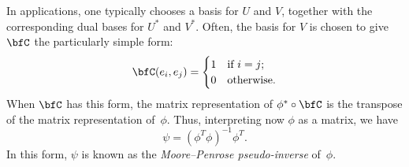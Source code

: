 \documentclass[10pt, a4paper]{article}
\begin{document}
In applications, one typically chooses a basis for $U$ and $V$,
together with the corresponding dual bases for $U^*$ and $V^*$. Often,
the basis for $V$ is chosen to give $\bfC$ the particularly simple
form:
\[
  \bfC(e_i, e_j) =
  \begin{cases}
    1 & \text{if $i=j$;} \\
    0 & \text{otherwise.}
  \end{cases}
\]
When $\bfC$ has this form, the matrix representation of
$\phi^*\circ \bfC$ is the transpose of the matrix representation
of~$\phi$. Thus, interpreting now $\phi$ as a
matrix, we have
\[
  \psi = (\phi^T\phi)^{-1}\phi^T.
\]
In this form, $\psi$ is known as the \emph{Moore--Penrose pseudo-inverse}
of~$\phi$.
\end{document}
